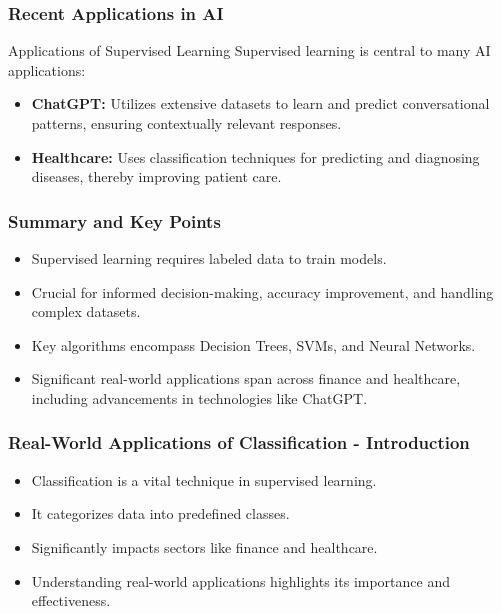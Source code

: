 \documentclass[aspectratio=169]{beamer}
\begin{document}
\begin{frame}[fragile]
    \frametitle{Recent Applications in AI}
    \begin{block}{Applications of Supervised Learning}
        Supervised learning is central to many AI applications:
    \end{block}
    \begin{itemize}
        \item \textbf{ChatGPT:} Utilizes extensive datasets to learn and predict conversational patterns, ensuring contextually relevant responses.
        \item \textbf{Healthcare:} Uses classification techniques for predicting and diagnosing diseases, thereby improving patient care.
    \end{itemize}
\end{frame}

\begin{frame}[fragile]
    \frametitle{Summary and Key Points}
    \begin{itemize}
        \item Supervised learning requires labeled data to train models.
        \item Crucial for informed decision-making, accuracy improvement, and handling complex datasets.
        \item Key algorithms encompass Decision Trees, SVMs, and Neural Networks.
        \item Significant real-world applications span across finance and healthcare, including advancements in technologies like ChatGPT.
    \end{itemize}
\end{frame}

\begin{frame}[fragile]
    \frametitle{Real-World Applications of Classification - Introduction}
    \begin{itemize}
        \item Classification is a vital technique in supervised learning.
        \item It categorizes data into predefined classes.
        \item Significantly impacts sectors like finance and healthcare.
        \item Understanding real-world applications highlights its importance and effectiveness.
    \end{itemize}
\end{frame}
\end{document}
